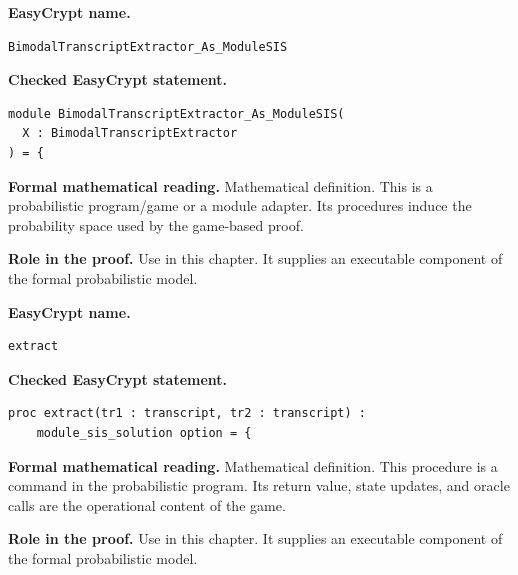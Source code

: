 \begin{formaldefinition}
\noindent\textbf{EasyCrypt name.}
\begin{lstlisting}[language=EasyCrypt,basicstyle=\ttfamily\scriptsize]
BimodalTranscriptExtractor_As_ModuleSIS
\end{lstlisting}
\noindent\textbf{Checked EasyCrypt statement.}
\begin{lstlisting}[language=EasyCrypt,basicstyle=\ttfamily\scriptsize]
module BimodalTranscriptExtractor_As_ModuleSIS(
  X : BimodalTranscriptExtractor
) = {
\end{lstlisting}
\noindent\textbf{Formal mathematical reading.}
Mathematical definition. This is a probabilistic program/game or a module adapter.  Its procedures induce the probability space used by the game-based proof.

\noindent\textbf{Role in the proof.}
Use in this chapter. It supplies an executable component of the formal probabilistic model.

\end{formaldefinition}

\begin{formaldefinition}
\noindent\textbf{EasyCrypt name.}
\begin{lstlisting}[language=EasyCrypt,basicstyle=\ttfamily\scriptsize]
extract
\end{lstlisting}
\noindent\textbf{Checked EasyCrypt statement.}
\begin{lstlisting}[language=EasyCrypt,basicstyle=\ttfamily\scriptsize]
proc extract(tr1 : transcript, tr2 : transcript) :
    module_sis_solution option = {
\end{lstlisting}
\noindent\textbf{Formal mathematical reading.}
Mathematical definition. This procedure is a command in the probabilistic program.  Its return value, state updates, and oracle calls are the operational content of the game.

\noindent\textbf{Role in the proof.}
Use in this chapter. It supplies an executable component of the formal probabilistic model.

\end{formaldefinition}

